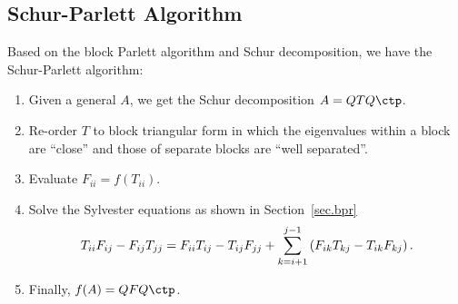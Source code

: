 \documentclass{article}
\begin{document}
\subsection{Schur-Parlett Algorithm}
Based on the block Parlett algorithm and Schur decomposition, we have
the Schur-Parlett algorithm:
\begin{enumerate}
    \item Given a general $A$, we get the Schur decomposition $A =
    QTQ\ctp$.
    \item Re-order $T$ to block triangular form in which the eigenvalues
    within a block are ``close'' and those of separate blocks are ``well
    separated''.
    \item Evaluate $F_{ii} = f(T_{ii})$.
    \item Solve the Sylvester equations as shown in
    Section~\ref{sec.bpr}
    \begin{equation}\notag 
        T_{i i} F_{i j}-F_{i j} T_{j j}=F_{i i} T_{i j}-T_{i j} F_{j j}+\sum_{k=i+1}^{j-1}\left(F_{i k} T_{k j}-T_{i k} F_{k j}\right).
    \end{equation}
    \item Finally, $f(A) = QFQ\ctp$.
\end{enumerate}
\end{document}
